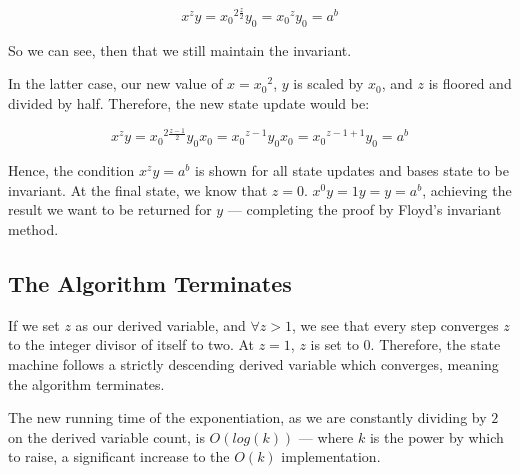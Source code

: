 \documentclass[letterpaper]{article}
\begin{document}
\begin{equation}
   x^zy = {x_0}^{2 \frac{z}{2}} y_0 = {x_0}^{z} y_0 = a^b
\end{equation}

So we can see, then that we still maintain the invariant.

In the latter case, our new value of \(x={x_0}^2\), \(y\) is scaled by \(x_0\), and \(z\) is floored and divided by half. Therefore, the new state update would be:

\begin{equation}
   x^zy = {x_0}^{2\frac{z-1}{2}}{y_0}{x_0} = {x_0}^{z-1}{y_0}{x_0} = {x_0}^{z-1+1}{y_0} = a^b
\end{equation}

Hence, the condition \(x^zy = a^b\) is shown for all state updates and bases state to be invariant. At the final state, we know that \(z=0\). \(x^0y = 1y = y=a^b\), achieving the result we want to be returned for \(y\) --- completing the proof by Floyd's invariant method.

\subsection{The Algorithm Terminates}
\label{sec:org7bc3e83}
If we set \(z\) as our derived variable, and \(\forall z>1\), we see that every step converges \(z\) to the integer divisor of itself to two. At \(z=1\), \(z\) is set to \(0\). Therefore, the state machine follows a strictly descending derived variable which converges, meaning the algorithm terminates.

The new running time of the exponentiation, as we are constantly dividing by \(2\) on the derived variable count, is \(O(log(k))\) --- where \(k\) is the power by which to raise, a significant increase to the \(O(k)\) implementation.
\end{document}
